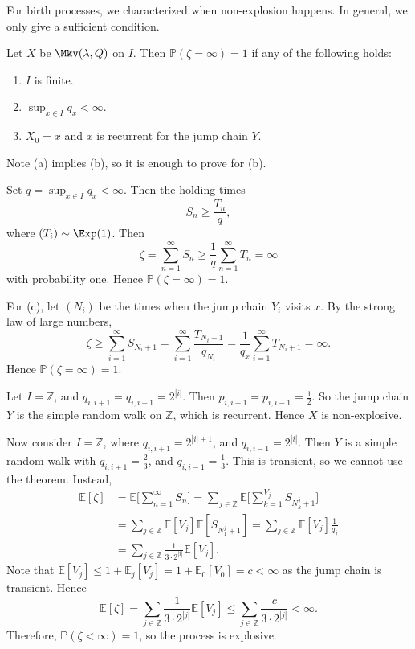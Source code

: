 \documentclass[12pt]{article}
\begin{document}
For birth processes, we characterized when non-explosion happens. In general, we only give a sufficient condition.

\begin{theorem}
	Let $X$ be $\Mkv(\lambda, Q)$ on $I$. Then $\mathbb{P}(\zeta = \infty) = 1$ if any of the following holds:
	\begin{enumerate}[\normalfont(a)]
		\item $I$ is finite.
		\item $\sup_{x \in I} q_x < \infty$.
		\item $X_0 = x$ and $x$ is recurrent for the jump chain $Y$.
	\end{enumerate}
\end{theorem}

\begin{proofbox}
	Note (a) implies (b), so it is enough to prove for (b).

	Set $q = \sup_{x \in I} q_x < \infty$. Then the holding times
	\[
	S_n \geq \frac{T_n}{q}
	,\]
	where $(T_i) \sim \Exp(1)$. Then
	\[
	\zeta = \sum_{n = 1}^{\infty} S_n \geq \frac{1}{q} \sum_{n = 1}^{\infty} T_n = \infty
	\]
	with probability one. Hence $\mathbb{P}(\zeta = \infty) = 1$.

	For (c), let $(N_i)$ be the times when the jump chain $Y_i$ visits $x$. By the strong law of large numbers,
	\[
	\zeta \geq \sum_{i = 1}^{\infty} S_{N_i+1} = \sum_{i = 1}^{\infty} \frac{T_{N_i+1}}{q_{N_i}} = \frac{1}{q_x} \sum_{i = 1}^{\infty} T_{N_i + 1} = \infty
	.\]
	Hence $\mathbb{P}(\zeta = \infty) = 1$.
\end{proofbox}

\begin{exbox}
	Let $I = \mathbb{Z}$, and $q_{i,i+1} = q_{i,i-1} = 2^{|i|}$. Then $p_{i,i+1} = p_{i,i-1} = \frac{1}{2}$. So the jump chain $Y$ is the simple random walk on $\mathbb{Z}$, which is recurrent. Hence $X$ is non-explosive.

	Now consider $I = \mathbb{Z}$, where $q_{i,i+1} = 2^{|i|+1}$, and $q_{i,i-1} = 2^{|i|}$. Then $Y$ is a simple random walk with $q_{i,i+1} = \frac{2}{3}$, and $q_{i,i-1} = \frac{1}{3}$. This is transient, so we cannot use the theorem. Instead,
	\begin{align*}
		\mathbb{E}[\zeta] &= \mathbb{E}\Biggl[ \sum_{n = 1}^{\infty} S_n \Biggr] = \sum_{j \in \mathbb{Z}} \mathbb{E}\Biggl[ \sum_{k = 1}^{V_j} S_{N_k^{j} + 1} \Biggr] \\
				  &= \sum_{j \in \mathbb{Z}} \mathbb{E}[V_j] \mathbb{E}[S_{N_1^{j} + 1}] = \sum_{j \in \mathbb{Z}} \mathbb{E}[V_j] \frac{1}{q_j} \\
				  &= \sum_{j \in \mathbb{Z}} \frac{1}{3 \cdot 2^{|i|}} \mathbb{E}[V_j].
	\end{align*}
	Note that $\mathbb{E}[V_j] \leq 1 + \mathbb{E}_j[V_j] = 1 + \mathbb{E}_0[V_0] = c < \infty$ as the jump chain is transient. Hence
	\[
	\mathbb{E}[\zeta] = \sum_{j \in \mathbb{Z}} \frac{1}{3 \cdot 2^{|j|}} \mathbb{E}[V_j] \leq \sum_{j \in \mathbb{Z}} \frac{c}{3 \cdot 2^{|j|}} < \infty
	.\]
	Therefore, $\mathbb{P}(\zeta < \infty) = 1$, so the process is explosive.
\end{exbox}
\end{document}

